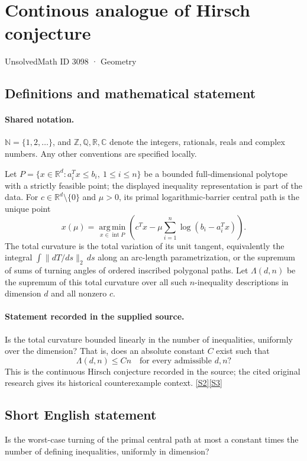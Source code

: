 \documentclass[11pt]{book}
\newcommand{\sref}[2]{\hyperlink{source:#1:#2}{[S#2]}}
\begin{document}
\setcounter{section}{3097}
\section{Continous analogue of Hirsch conjecture}\label{3098}
{\small\sffamily UnsolvedMath ID 3098 · Geometry}
\subsection{Definitions and mathematical statement}

\paragraph{Shared notation.}$\mathbb N=\{1,2,\ldots\}$, and $\mathbb Z,\mathbb Q,\mathbb R,\mathbb C$ denote the integers, rationals, reals and complex numbers. Any other conventions are specified locally.


Let $P=\{x\in\mathbb R^d:a_i^Tx\leq b_i,\ 1\leq i\leq n\}$ be a bounded full-dimensional polytope with a strictly feasible point; the displayed inequality representation is part of the data. For $c\in\mathbb R^d\setminus\{0\}$ and $\mu>0$, its primal logarithmic-barrier central path is the unique point
\[x(\mu)=\operatorname*{arg\,min}_{x\in\operatorname{int}P}\left(c^Tx-\mu\sum_{i=1}^n\log(b_i-a_i^Tx)\right).\]
The total curvature is the total variation of its unit tangent, equivalently the integral $\int\|dT/ds\|_2\,ds$ along an arc-length parametrization, or the supremum of sums of turning angles of ordered inscribed polygonal paths. Let $\Lambda(d,n)$ be the supremum of this total curvature over all such $n$-inequality descriptions in dimension $d$ and all nonzero $c$.
\paragraph{Statement recorded in the supplied source.}
Is the total curvature bounded linearly in the number of inequalities, uniformly over the dimension? That is, does an absolute constant $C$ exist such that
\[\Lambda(d,n)\leq Cn\quad\text{for every admissible }d,n?\]
This is the continuous Hirsch conjecture recorded in the source; the cited original research gives its historical counterexample context. \sref{3098}{2}\sref{3098}{3}
\subsection{Short English statement}
Is the worst-case turning of the primal central path at most a constant times the number of defining inequalities, uniformly in dimension?
\end{document}
